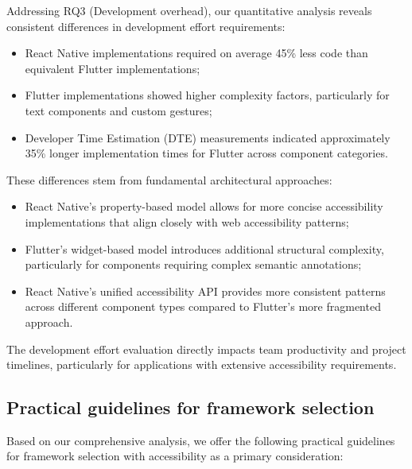 Addressing RQ3 (Development overhead), our quantitative analysis reveals consistent differences in development effort requirements:

\begin{itemize}
    \item React Native implementations required on average 45\% less code than equivalent Flutter implementations;
    
    \item Flutter implementations showed higher complexity factors, particularly for text components and custom gestures;
    
    \item Developer Time Estimation (DTE) measurements indicated approximately 35\% longer implementation times for Flutter across component categories.
\end{itemize}

These differences stem from fundamental architectural approaches:

\begin{itemize}
    \item React Native's property-based model allows for more concise accessibility implementations that align closely with web accessibility patterns;
    
    \item Flutter's widget-based model introduces additional structural complexity, particularly for components requiring complex semantic annotations;
    
    \item React Native's unified accessibility API provides more consistent patterns across different component types compared to Flutter's more fragmented approach.
\end{itemize}

The development effort evaluation directly impacts team productivity and project timelines, particularly for applications with extensive accessibility requirements.

\subsection{Practical guidelines for framework selection}
\label{subsec:framework-selection}

Based on our comprehensive analysis, we offer the following practical guidelines for framework selection with accessibility as a primary consideration:

